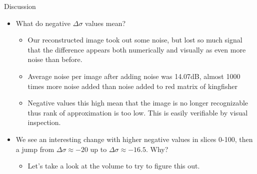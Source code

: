 \documentclass[aspectratio=169,xcolor=dvipsnames]{beamer}
\begin{document}
	
	\begin{frame}{Discussion}
		\begin{itemize}
			\item What do negative $\Delta \sigma$ values mean?
			\begin{itemize}
				\item Our reconstructed image took out some noise, but lost so much signal that the difference appears both numerically and visually as even more noise than before.
				\item Average noise per image after adding noise was 14.07dB, almost 1000 times more noise added than noise added to red matrix of kingfisher
				\item Negative values this high mean that the image is no longer recognizable thus rank of approximation is too low. This is easily verifiable by visual inspection.
			\end{itemize}
			\item We see an interesting change with higher negative values in slices 0-100, then a jump from $\Delta\sigma \approx -20$ up to $\Delta\sigma\approx -16.5$. Why?
			\begin{itemize}
				\item Let's take a look at the volume to try to figure this out.
			\end{itemize}
		\end{itemize}
	\end{frame}
	
	
\end{document}
